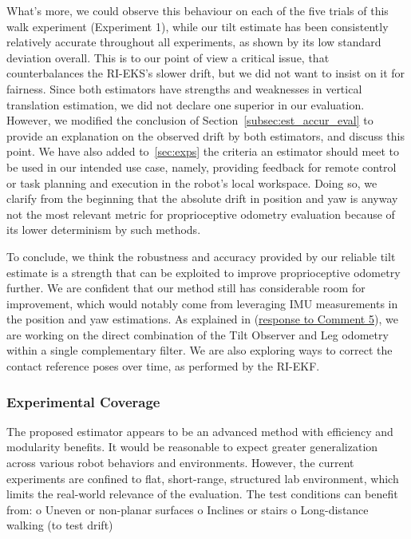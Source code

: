 What's more, we could observe this behaviour on each of the five trials of this walk experiment (Experiment 1), while our tilt estimate has been consistently relatively accurate throughout all experiments, as shown by its low standard deviation overall.
This is to our point of view a critical issue, that counterbalances the RI-EKS's slower drift, but we did not want to insist on it for fairness. 
Since both estimators have strengths and weaknesses in vertical translation estimation, we did not declare one superior in our evaluation. However, we modified the conclusion of Section~\ref{subsec:est_accur_eval} to provide an explanation on the observed drift by both estimators, and discuss this point. We have also added to~\ref{sec:exps} the criteria an estimator should meet to be used in our intended use case, namely, providing feedback for remote control or task planning and execution in the robot's local workspace. Doing so, we clarify from the beginning that the absolute drift in position and yaw is anyway not the most relevant metric for proprioceptive odometry evaluation because of its lower determinism by such methods. 



To conclude, we think the robustness and accuracy provided by our reliable tilt estimate is a strength that can be exploited to improve proprioceptive odometry further. We are confident that our method still has considerable room for improvement, which would notably come from leveraging IMU measurements in the position and yaw estimations. As explained in (\hyperlink{CommentSe3Fusion}{response to Comment 5}), we are working on the direct combination of the Tilt Observer and Leg odometry within a single complementary filter. We are also exploring ways to correct the contact reference poses over time, as performed by the RI-EKF.



\subsubsection{Experimental Coverage}

\begin{revquote}
The proposed estimator appears to be an advanced method with efficiency and modularity benefits. It would be reasonable to expect greater generalization across various robot behaviors and environments.
However, the current experiments are confined to flat, short-range, structured lab environment, which limits the real-world relevance of the evaluation.
The test conditions can benefit from:
    o Uneven or non-planar surfaces
    o Inclines or stairs
    o Long-distance walking (to test drift)
\end{revquote}

